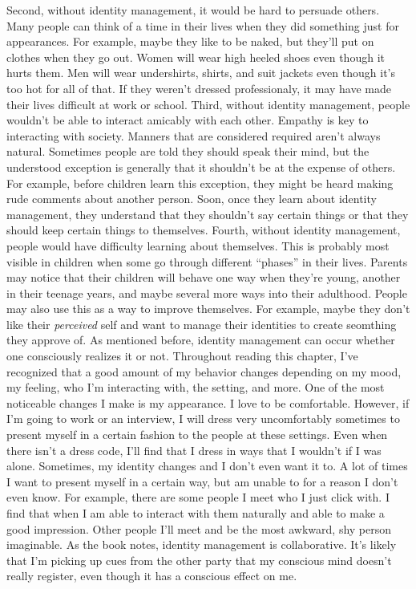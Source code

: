 \documentclass[12pt]{article}
\begin{document}
\newline
\indent Second, without identity management, it would be hard to persuade others.  Many people can think of a time in their lives when they did something just for appearances.  For example, maybe they like to be naked, but they'll put on clothes when they go out.  Women will wear high heeled shoes even though it hurts them.  Men will wear undershirts, shirts, and suit jackets even though it's too hot for all of that.  If they weren't dressed professionaly, it may have made their lives difficult at work or school.
\newline
\indent Third, without identity management, people wouldn't be able to interact amicably with each other.  Empathy is key to interacting with society.   Manners that are considered required aren't always natural.  Sometimes people are told they should speak their mind, but the understood exception is generally that it shouldn't be at the expense of others.  For example, before children learn this exception, they might be heard making rude comments about another person.  Soon, once they learn about identity management, they understand that they shouldn't say certain things or that they should keep certain things to themselves.
\newline
\indent Fourth, without identity management, people would have difficulty learning about themselves.  This is probably most visible in children when some go through different ``phases'' in their lives.  Parents may notice that their children will behave one way when they're young, another in their teenage years, and maybe several more ways into their adulthood.  People may also use this as a way to improve themselves.  For example, maybe they don't like their \emph{perceived} self and want to manage their identities to create seomthing they approve of.
\newline
\indent As mentioned before, identity management can occur whether one consciously realizes it or not.  Throughout reading this chapter, I've recognized that a good amount of my behavior changes depending on my mood, my feeling, who I'm interacting with, the setting, and more.  One of the most noticeable changes I make is my appearance.  I love to be comfortable.  However, if I'm going to work or an interview, I will dress very uncomfortably sometimes to present myself in a certain fashion to the people at these settings.  Even when there isn't a dress code, I'll find that I dress in ways that I wouldn't if I was alone.
\newline
\indent Sometimes, my identity changes and I don't even want it to.  A lot of times I want to present myself in a certain way, but am unable to for a reason I don't even know.  For example, there are some people I meet who I just click with.  I find that when I am able to interact with them naturally and able to make a good impression.  Other people I'll meet and be the most awkward, shy person imaginable.  As the book notes, identity management is collaborative.  It's likely that  I'm picking up cues from the other party that my conscious mind doesn't really register, even though it has a conscious effect on me. 
\end{document}
